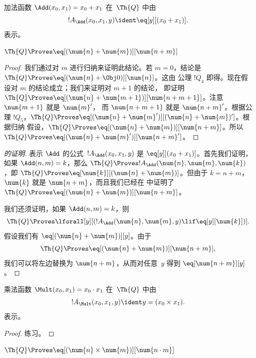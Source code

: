 \documentclass[../../../include/open-logic-section]{subfiles}
\begin{document}
\begin{prop}
加法函数 $\Add(x_0, x_1) = x_0+x_1$ 在~$\Th{Q}$ 中由
\[
  !A_{\Add}(x_0, x_1, y) \ident \eq[y][(x_0 + x_1)].
\] 表示。
\end{prop}

\begin{lem}
$\Th{Q} \Proves \eq[(\num{n} + \num{m})][\num{n+m}]$
\end{lem}

\begin{proof}
我们通过对 $m$ 进行归纳来证明此结论。若 $m = 0$，结论是
$\Th{Q} \Proves \eq[(\num{n} + \Obj 0)][\num{n}]$。这由
公理 $!Q_4$ 即得。现在假设对 $m$ 的结论成立；我们来证明对 $m+1$ 的结论，
即证明 $\Th{Q} \Proves \eq[(\num{n} +
  \num{m+1})][\num{n+m+1}]$。注意 $\num{m+1}$ 就是 $\num{m}'$，
而 $\num{n+m+1}$ 就是 $\num{n+m}'$。根据公理 $!Q_5$，$\Th{Q}
\Proves \eq[(\num{n} + \num{m}')][(\num{n}+\num{m})']$。根据归纳
假设，$\Th{Q} \Proves \eq[(\num{n} + \num{m})][\num{n+m}]$。所以
$\Th{Q} \Proves \eq[(\num{n} + \num{m}')][\num{n+m}']$。
\end{proof}

\begin{proof}[ 的证明]
表示 $\Add$ 的公式~$!A_\Add(x_0, x_1, y)$ 是
$\eq[y][(x_0 + x_1)]$。首先我们证明，如果 $\Add(n, m) = k$，那么
$\Th{Q} \Proves !A_\Add(\num{n}, \num{m}, \num{k})$，即 $\Th{Q}
\Proves \eq[\num{k}][(\num{n} + \num{m})]$。但由于 $k = n + m$，
$\num{k}$ 就是 $\num{n+m}$，而且我们已经在
 中证明了 $\Th{Q} \Proves \eq[(\num{n} +
  \num{m})][\num{n+m}]$。

我们还须证明，如果 $\Add(n, m) = k$，则
\[
\Th{Q} \Proves \lforall[y][(!A_\Add(\num{n}, \num{m}, y) \lif
  \eq[y][\num{k}])].
\]
假设我们有 $\eq[(\num{n} + \num{m})][y]$。由于
\[
\Th{Q} \Proves \eq[(\num{n}+\num{m})][\num{n+m}],
\]
我们可以将左边替换为 $\num{n+m}$，从而对任意~$y$ 得到
$\eq[\num{n+m}][y]$。
\end{proof}

\begin{prop}
乘法函数 $\Mult(x_0, x_1) = x_0 \cdot x_1$ 在~$\Th{Q}$ 中由
\[
  !A_{\Mult}(x_0, x_1, y) \ident y = (x_0 \times x_1).
\] 表示。
\end{prop}

\begin{proof} 练习。\end{proof}

\begin{lem}
$\Th{Q} \Proves \eq[(\num{n} \times \num{m})][\num{n \cdot m}]$
\end{lem}
\end{document}
